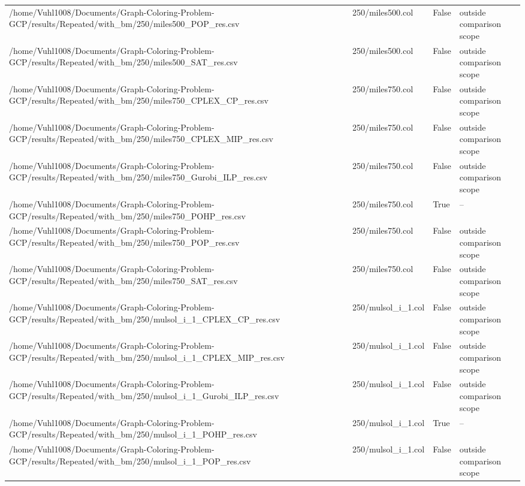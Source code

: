 \begin{table}[htbp]
\begin{tabular}{llll}
/home/Vuhl1008/Documents/Graph-Coloring-Problem-GCP/results/Repeated/with\_bm/250/miles500\_POP\_res.csv & 250/miles500.col & False & outside comparison scope \\
/home/Vuhl1008/Documents/Graph-Coloring-Problem-GCP/results/Repeated/with\_bm/250/miles500\_SAT\_res.csv & 250/miles500.col & False & outside comparison scope \\
/home/Vuhl1008/Documents/Graph-Coloring-Problem-GCP/results/Repeated/with\_bm/250/miles750\_CPLEX\_CP\_res.csv & 250/miles750.col & False & outside comparison scope \\
/home/Vuhl1008/Documents/Graph-Coloring-Problem-GCP/results/Repeated/with\_bm/250/miles750\_CPLEX\_MIP\_res.csv & 250/miles750.col & False & outside comparison scope \\
/home/Vuhl1008/Documents/Graph-Coloring-Problem-GCP/results/Repeated/with\_bm/250/miles750\_Gurobi\_ILP\_res.csv & 250/miles750.col & False & outside comparison scope \\
/home/Vuhl1008/Documents/Graph-Coloring-Problem-GCP/results/Repeated/with\_bm/250/miles750\_POHP\_res.csv & 250/miles750.col & True & -- \\
/home/Vuhl1008/Documents/Graph-Coloring-Problem-GCP/results/Repeated/with\_bm/250/miles750\_POP\_res.csv & 250/miles750.col & False & outside comparison scope \\
/home/Vuhl1008/Documents/Graph-Coloring-Problem-GCP/results/Repeated/with\_bm/250/miles750\_SAT\_res.csv & 250/miles750.col & False & outside comparison scope \\
/home/Vuhl1008/Documents/Graph-Coloring-Problem-GCP/results/Repeated/with\_bm/250/mulsol\_i\_1\_CPLEX\_CP\_res.csv & 250/mulsol\_i\_1.col & False & outside comparison scope \\
/home/Vuhl1008/Documents/Graph-Coloring-Problem-GCP/results/Repeated/with\_bm/250/mulsol\_i\_1\_CPLEX\_MIP\_res.csv & 250/mulsol\_i\_1.col & False & outside comparison scope \\
/home/Vuhl1008/Documents/Graph-Coloring-Problem-GCP/results/Repeated/with\_bm/250/mulsol\_i\_1\_Gurobi\_ILP\_res.csv & 250/mulsol\_i\_1.col & False & outside comparison scope \\
/home/Vuhl1008/Documents/Graph-Coloring-Problem-GCP/results/Repeated/with\_bm/250/mulsol\_i\_1\_POHP\_res.csv & 250/mulsol\_i\_1.col & True & -- \\
/home/Vuhl1008/Documents/Graph-Coloring-Problem-GCP/results/Repeated/with\_bm/250/mulsol\_i\_1\_POP\_res.csv & 250/mulsol\_i\_1.col & False & outside comparison scope \\

\end{tabular}
\end{table}
